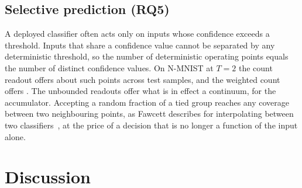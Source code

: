 \documentclass[10pt]{article}
\begin{document}
\subsection{Selective prediction (RQ5)}
\label{sec:selective}

A deployed classifier often acts only on inputs whose confidence exceeds a threshold. Inputs that
share a confidence value cannot be separated by any deterministic threshold, so the number of
deterministic operating points equals the number of distinct confidence values. On N-MNIST at
$T=2$ the count readout offers about \roCountOps{} such points across \nmSplitTest{} test samples, %
and the weighted count offers \roWcOps. The unbounded readouts offer what is in effect a %
continuum, \roAccOps{} for the accumulator. Accepting a random fraction of a tied group reaches any %
coverage between two neighbouring points, as Fawcett describes for interpolating between two
classifiers~\citep{fawcett2006roc}, at the price of a decision that is no longer a function of the %
input alone.


\FloatBarrier

\section{Discussion}
\label{sec:discussion}
\end{document}
